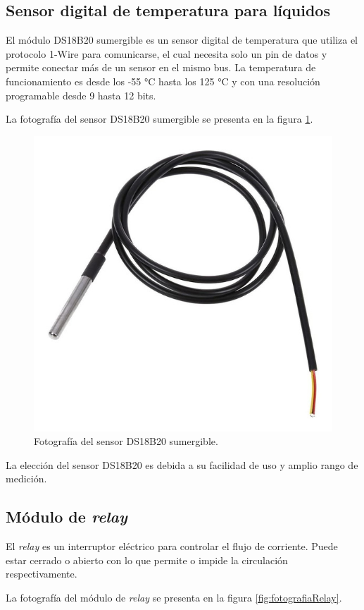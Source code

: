\subsection{Sensor digital de temperatura para líquidos}

El módulo DS18B20 \citep{WEBSITE:DS18B20} sumergible es un sensor digital de temperatura que utiliza el protocolo 1-Wire \citep{WEBSITE:1WIRE} para comunicarse, el cual necesita solo un pin de datos y permite conectar más de un sensor en el mismo bus. La temperatura de funcionamiento es desde los -55 °C hasta los 125 °C y con una resolución programable desde 9 hasta 12 bits.

La fotografía del sensor DS18B20 sumergible se presenta en la figura \ref{fig:fotografiaDS18B20}.

\begin{figure}[H]
	\centering
	\includegraphics[width=.5\textwidth]{./Figures/DS18B20.jpg}
	\caption{Fotografía del sensor DS18B20 sumergible\protect\footnotemark.}
	\label{fig:fotografiaDS18B20}
\end{figure}


La elección del sensor DS18B20 es debida a su facilidad de uso y amplio rango de medición.

\subsection{Módulo de \emph{relay}}

El \textit{relay} es un interruptor eléctrico para controlar el flujo de corriente. Puede estar cerrado o abierto con lo que permite o impide la circulación respectivamente.

La fotografía del módulo de \emph{relay} se presenta en la figura \ref{fig:fotografiaRelay}.

